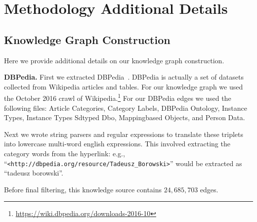 \documentclass[final]{cvpr}
\providecommand{\myparagraph}[1]{\noindent\textbf{#1.}}
\begin{document}
\vspace{.2cm}



{\small


}

\clearpage
\appendix

\section{Methodology Additional Details}
\label{appx:method}

\subsection{Knowledge Graph Construction}
\label{appx:kgconstruction}
Here we provide additional details on our knowledge graph construction.

\myparagraph{DBPedia}
First we extracted DBPedia~\cite{auer2007dbpedia}. DBPedia is actually a set of datasets collected from Wikipedia articles and tables. For our knowledge graph we used the October 2016 crawl of Wikipedia.\footnote{\url{https://wiki.dbpedia.org/downloads-2016-10}} For our DBPedia edges we used the following files: Article Categories, Category Labels, DBPedia Ontology, Instance Types, Instance Types Sdtyped Dbo, Mappingbased Objects, and Person Data. 

Next we wrote string parsers and regular expressions to translate these triplets into lowercase multi-word english expressions. This involved extracting the category words from the hyperlink: e.g., ``\texttt{\footnotesize <http://dbpedia.org/resource/Tadeusz\_Borowski>}'' would be extracted as ``tadeusz borowski''. 

Before final filtering, this knowledge source contains $24,685,703$ edges.
\end{document}
